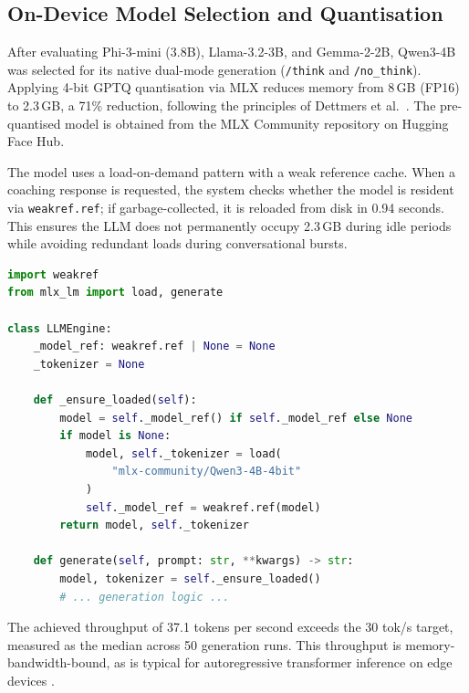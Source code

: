 \subsection{On-Device Model Selection and Quantisation}
\label{subsec:model-selection}

After evaluating Phi-3-mini (3.8B), Llama-3.2-3B, and Gemma-2-2B, Qwen3-4B \cite{yang2025} was selected for its native dual-mode generation (\texttt{/think} and \texttt{/no\_think}). Applying 4-bit GPTQ quantisation via MLX reduces memory from 8\,GB (FP16) to 2.3\,GB, a 71\% reduction, following the principles of Dettmers et al.\ \cite{dettmers2023}. The pre-quantised model is obtained from the MLX Community repository on Hugging Face Hub.

The model uses a load-on-demand pattern with a weak reference cache. When a coaching response is requested, the system checks whether the model is resident via \texttt{weakref.ref}; if garbage-collected, it is reloaded from disk in 0.94 seconds. This ensures the LLM does not permanently occupy 2.3\,GB during idle periods while avoiding redundant loads during conversational bursts.

\begin{lstlisting}[language=Python, caption={Load-on-demand LLM pattern with weak reference cache (abbreviated).}, label={lst:llm-load}]
import weakref
from mlx_lm import load, generate

class LLMEngine:
    _model_ref: weakref.ref | None = None
    _tokenizer = None

    def _ensure_loaded(self):
        model = self._model_ref() if self._model_ref else None
        if model is None:
            model, self._tokenizer = load(
                "mlx-community/Qwen3-4B-4bit"
            )
            self._model_ref = weakref.ref(model)
        return model, self._tokenizer

    def generate(self, prompt: str, **kwargs) -> str:
        model, tokenizer = self._ensure_loaded()
        # ... generation logic ...
\end{lstlisting}

The achieved throughput of 37.1 tokens per second exceeds the 30 tok/s target, measured as the median across 50 generation runs. This throughput is memory-bandwidth-bound, as is typical for autoregressive transformer inference on edge devices \cite{lin2025, xu2024}.

